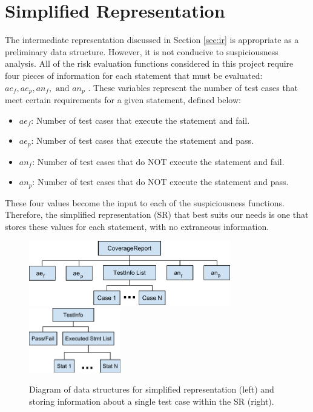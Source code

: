 \section{Simplified Representation} \label{sec:sir}

The intermediate representation discussed in Section \ref{sec:ir} is appropriate as a preliminary
data structure.  However, it is not conducive to suspiciousness analysis.  All of the risk evaluation
functions considered in this project require four pieces of information for each statement that
must be evaluated: $ae_f, ae_p, an_f, \text{ and } an_p$ \cite{theory}.  These variables represent the number
of test cases that meet certain requirements for a given statement, defined below:

\begin{itemize}
\item $ae_f$:  Number of test cases that execute the statement and fail.
\item $ae_p$:  Number of test cases that execute the statement and pass.
\item $an_f$:  Number of test cases that do NOT execute the statement and fail.
\item $an_p$:  Number of test cases that do NOT execute the statement and pass.
\end{itemize}

These four values become the input to each of
the suspiciousness functions.  Therefore, the simplified representation (SR) that best suits our needs
is one that stores these values for each statement, with no extraneous information.

\begin{figure}[tb]
\centering
\includegraphics[height=28mm]{img/CoverageReport.pdf}
\hspace{0.1\linewidth}
\includegraphics[height=28mm]{img/TestInfo.pdf}
\caption{Diagram of data structures for simplified representation (left) and  storing information
about a single test case within the SR (right).}
\label{fig:sr}
\end{figure}

